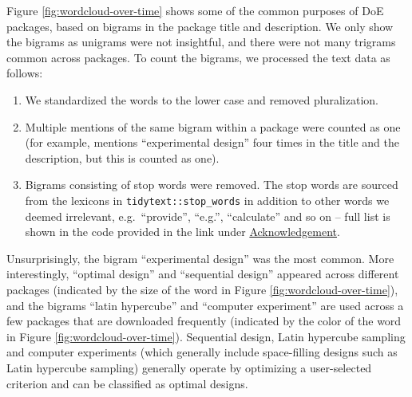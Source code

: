 Figure \ref{fig:wordcloud-over-time} shows some of the common purposes of DoE packages, based on bigrams in the package title and description. We only show the bigrams as unigrams were not insightful, and there were not many trigrams common across packages. To count the bigrams, we processed the text data as follows:

\begin{enumerate}
\def\labelenumi{\arabic{enumi}.}
\tightlist
\item
  We standardized the words to the lower case and removed pluralization.
\item
  Multiple mentions of the same bigram within a package were counted as one (for example,  mentions ``experimental design'' four times in the title and the description, but this is counted as one).
\item
  Bigrams consisting of stop words were removed. The stop words are sourced from the lexicons in \texttt{tidytext::stop\_words} in addition to other words we deemed irrelevant, e.g.~``provide'', ``e.g.'', ``calculate'' and so on -- full list is shown in the code provided in the link under \hyperref[pkgs]{Acknowledgement}.
\end{enumerate}

Unsurprisingly, the bigram ``experimental design'' was the most common. More interestingly, ``optimal design'' and ``sequential design'' appeared across different packages (indicated by the size of the word in Figure \ref{fig:wordcloud-over-time}), and the bigrams ``latin hypercube'' and ``computer experiment'' are used across a few packages that are downloaded frequently (indicated by the color of the word in Figure \ref{fig:wordcloud-over-time}). Sequential design, Latin hypercube sampling and computer experiments (which generally include space-filling designs such as Latin hypercube sampling) generally operate by optimizing a user-selected criterion and can be classified as optimal designs.

